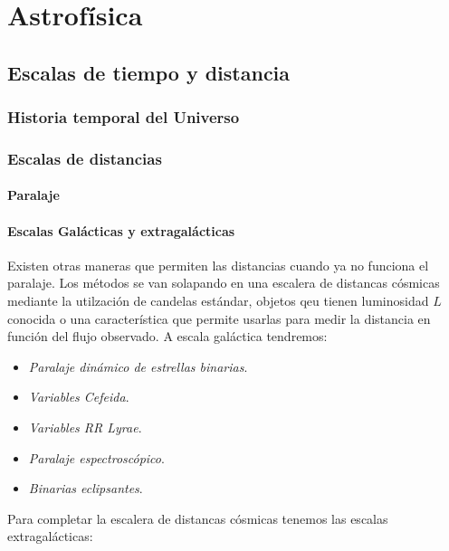 \chapter{Astrofísica}




\section{Escalas de tiempo y distancia}

\subsection{Historia temporal del Universo}

\subsection{Escalas de distancias}

\subsubsection{Paralaje}

\subsubsection{Escalas Galácticas y extragalácticas}

Existen otras maneras que permiten las distancias cuando ya no funciona el paralaje. Los métodos se van solapando en una escalera de distancas cósmicas mediante la utilzación de candelas estándar, objetos qeu tienen luminosidad $L$ conocida o una característica que permite usarlas para medir la distancia en función del flujo observado. A escala galáctica tendremos:

\begin{itemize}
    \item \textit{Paralaje dinámico de estrellas binarias}.
    \item \textit{Variables Cefeida}. 
    \item \textit{Variables RR Lyrae}.
    \item \textit{Paralaje espectroscópico}.
    \item \textit{Binarias eclipsantes}.
\end{itemize}
Para completar la escalera de distancas cósmicas tenemos las escalas extragalácticas:

